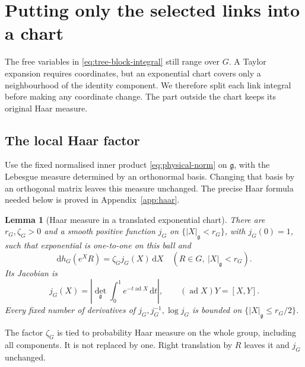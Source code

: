 \documentclass[11pt,reqno]{amsart}
\numberwithin{equation}{section}
\newtheorem{lemma}[theorem]{Lemma}
\theoremstyle{definition}
\theoremstyle{remark}
\newcommand{\dd}{\mathrm d}
\newcommand{\g}{\mathfrak g}
\DeclareMathOperator{\ad}{ad}
\begin{document}
\section{Putting only the selected links into a chart}
\label{sec:sectors}

The free variables in \eqref{eq:tree-block-integral} still range over
\(G\). A Taylor expansion requires coordinates, but an exponential
chart covers only a neighbourhood of the identity component. We
therefore split each link integral before making any coordinate
change. The part outside the chart keeps its original Haar measure.

\subsection{The local Haar factor}

Use the fixed normalised inner product \eqref{eq:physical-norm}
on \(\g\), with the Lebesgue measure determined by an orthonormal basis.
Changing that basis by an orthogonal matrix leaves this measure
unchanged. The precise Haar formula needed below is proved in
Appendix~\ref{app:haar}.

\begin{lemma}[Haar measure in a translated exponential chart]
\label{lem:haar-chart}
There are \(r_G,\zeta_G>0\) and a smooth positive function \(j_G\)
on \(\{|X|_{\g}<r_G\}\), with \(j_G(0)=1\), such that exponential
is one-to-one on this ball and
\begin{equation}
       \dd h_G(e^XR)=\zeta_Gj_G(X)\,\dd X
       \quad (R\in G,\ |X|_{\g}<r_G).
 \label{eq:haar-chart}
\end{equation}
Its Jacobian is
\begin{equation}
 j_G(X)=\left|\det_{\g}\int_0^1e^{-t\ad X}\,\dd t\right|,
 \qquad (\ad X)Y=[X,Y].
 \label{eq:haar-jacobian}
\end{equation}
Every fixed number of derivatives of \(j_G,j_G^{-1},\log j_G\)
is bounded on \(\{|X|_{\g}\le r_G/2\}\).
\end{lemma}

The factor \(\zeta_G\) is tied to probability Haar measure on the
whole group, including all components. It is not replaced by one.
Right translation by \(R\) leaves it and \(j_G\) unchanged.
\end{document}
